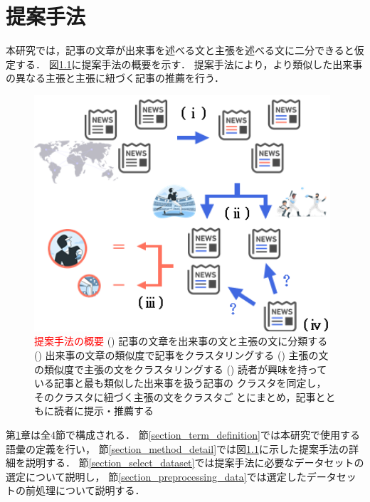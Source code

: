 \documentclass[12pt,a4j]{jreport}
\begin{document}
\chapter{提案手法}
\label{chapter_method}

本研究では，記事の文章が出来事を述べる文と主張を述べる文に二分できると仮定する．
図\ref{fig_method_abstract}に提案手法の概要を示す．
提案手法により，より類似した出来事の異なる主張と主張に紐づく記事の推薦を行う．

\begin{figure}[H]
	\centering
	\includegraphics[keepaspectratio, width=110mm]{img/method_abstract.png}
	\caption{
    \textcolor{red}{提案手法の概要}
    \newline
    \qquad\quad()
    記事の文章を出来事の文と主張の文に分類する
    \newline
    \qquad\quad()
    出来事の文章の類似度で記事をクラスタリングする
    \newline
    \qquad\quad()
    主張の文の類似度で主張の文をクラスタリングする
    \newline
    \qquad\quad()
    読者が興味を持っている記事と最も類似した出来事を扱う記事の
    \newline
    \qquad\qquad\quad
    クラスタを同定し，そのクラスタに紐づく主張の文をクラスタご
    \newline
    \qquad\qquad\quad
    とにまとめ，記事とともに読者に提示・推薦する
  }
	\label{fig_method_abstract}
\end{figure}

第\ref{chapter_method}章は全4節で構成される．
節\ref{section_term_definition}では本研究で使用する語彙の定義を行い，
節\ref{section_method_detail}では図\ref{fig_method_abstract}に示した提案手法の詳細を説明する．
節\ref{section_select_dataset}では提案手法に必要なデータセットの選定について説明し，
節\ref{section_preprocessing_data}では選定したデータセットの前処理について説明する．
\end{document}
